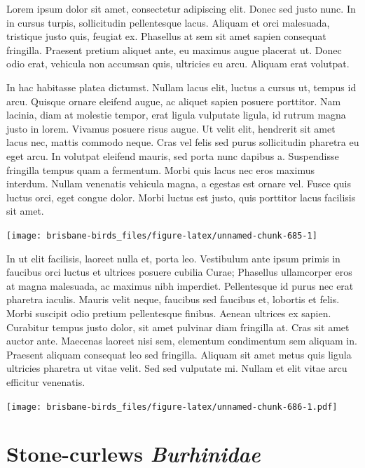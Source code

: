 \documentclass[]{book}
\let\origfigure\figure
\let\endorigfigure\endfigure
\renewenvironment{figure}[1][2] {
  \expandafter\origfigure\expandafter[H]
} {
  \endorigfigure
}
\begin{document}
Lorem ipsum dolor sit amet, consectetur adipiscing elit. Donec sed justo
nunc. In in cursus turpis, sollicitudin pellentesque lacus. Aliquam et
orci malesuada, tristique justo quis, feugiat ex. Phasellus at sem sit
amet sapien consequat fringilla. Praesent pretium aliquet ante, eu
maximus augue placerat ut. Donec odio erat, vehicula non accumsan quis,
ultricies eu arcu. Aliquam erat volutpat.

In hac habitasse platea dictumst. Nullam lacus elit, luctus a cursus ut,
tempus id arcu. Quisque ornare eleifend augue, ac aliquet sapien posuere
porttitor. Nam lacinia, diam at molestie tempor, erat ligula vulputate
ligula, id rutrum magna justo in lorem. Vivamus posuere risus augue. Ut
velit elit, hendrerit sit amet lacus nec, mattis commodo neque. Cras vel
felis sed purus sollicitudin pharetra eu eget arcu. In volutpat eleifend
mauris, sed porta nunc dapibus a. Suspendisse fringilla tempus quam a
fermentum. Morbi quis lacus nec eros maximus interdum. Nullam venenatis
vehicula magna, a egestas est ornare vel. Fusce quis luctus orci, eget
congue dolor. Morbi luctus est justo, quis porttitor lacus facilisis sit
amet.

\begin{figure}
\texttt{[image: brisbane-birds\_files/figure-latex/unnamed-chunk-685-1]} \caption{insert figure caption}\label{fig:unnamed-chunk-685}
\end{figure}

In ut elit facilisis, laoreet nulla et, porta leo. Vestibulum ante ipsum
primis in faucibus orci luctus et ultrices posuere cubilia Curae;
Phasellus ullamcorper eros at magna malesuada, ac maximus nibh
imperdiet. Pellentesque id purus nec erat pharetra iaculis. Mauris velit
neque, faucibus sed faucibus et, lobortis et felis. Morbi suscipit odio
pretium pellentesque finibus. Aenean ultrices ex sapien. Curabitur
tempus justo dolor, sit amet pulvinar diam fringilla at. Cras sit amet
auctor ante. Maecenas laoreet nisi sem, elementum condimentum sem
aliquam in. Praesent aliquam consequat leo sed fringilla. Aliquam sit
amet metus quis ligula ultricies pharetra ut vitae velit. Sed sed
vulputate mi. Nullam et elit vitae arcu efficitur venenatis.

\begin{figure}
\centering
\texttt{[image: brisbane-birds\_files/figure-latex/unnamed-chunk-686-1.pdf]}
\caption{\label{fig:unnamed-chunk-686}insert figure caption}
\end{figure}

\chapter{\texorpdfstring{Stone-curlews
\emph{Burhinidae}}{Stone-curlews Burhinidae}}\label{stone-curlews-burhinidae}
\end{document}
